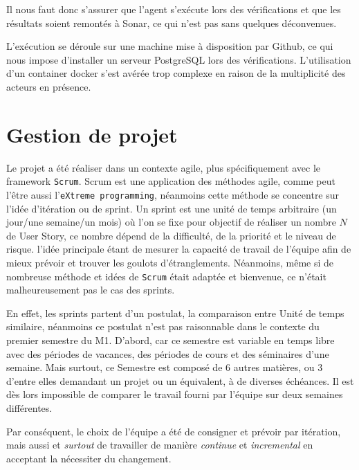 \documentclass[a4paper,french,final]{memoir}
\begin{document}
Il nous faut donc s'assurer que l'agent s'exécute lors des vérifications et que les résultats soient remontés à Sonar, ce qui n'est pas sans quelques déconvenues.

L'exécution se déroule sur une machine mise à disposition par Github, ce qui nous impose d'installer un serveur PostgreSQL lors des vérifications. L'utilisation d'un container docker s'est avérée trop complexe en raison de la multiplicité des acteurs en présence.
%
\chapter{Gestion de projet}\label{chap:gestProjet}



Le projet a été réaliser dans un contexte agile, plus spécifiquement avec le framework \texttt{Scrum}.
Scrum est une application des méthodes agile, comme peut l'être aussi l'\texttt{eXtreme programming}, néanmoins cette méthode
se concentre sur l'idée d'itération ou de sprint. Un sprint est une unité de temps arbitraire (un jour/une semaine/un mois) où l'on
se fixe pour objectif de réaliser un nombre $N$ de User Story, ce nombre dépend de la difficulté, de la priorité et le niveau de
risque. l'idée principale étant de mesurer la capacité de travail de l'équipe afin de mieux prévoir et trouver les goulots
d'étranglements. Néanmoins, même si de nombreuse méthode et idées de \texttt{Scrum} était adaptée et bienvenue, ce n'était malheureusement pas le cas des sprints.



En effet, les sprints partent d'un postulat, la comparaison entre Unité de temps similaire, néanmoins ce postulat n'est 
pas raisonnable dans le contexte du premier semestre du M1. D'abord, car ce semestre est variable en temps libre avec des périodes de
vacances, des périodes de cours et des séminaires d'une semaine. Mais surtout, ce Semestre est composé de 6 autres matières, ou 3 d'entre elles demandant un projet ou un équivalent, à de diverses échéances. Il est dès lors impossible de comparer le travail fourni par l'équipe sur deux semaines différentes.



Par conséquent, le choix de l'équipe a été de consigner et prévoir par itération, mais aussi et \emph{surtout} de travailler de
manière \emph{continue} et \emph{incremental} en acceptant la nécessiter du changement.
\end{document}
